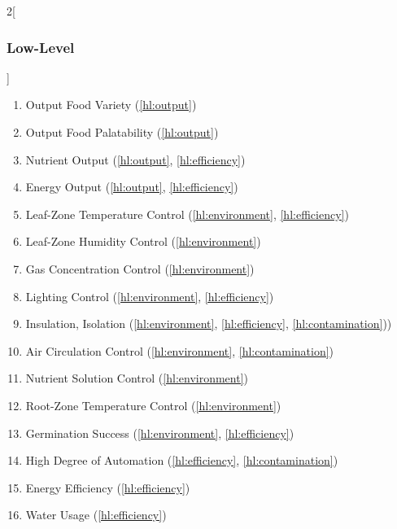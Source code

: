 \documentclass{report}
\begin{document}
\begin{multicols}{2}[\subsubsection{Low-Level}\label{sec:llos}]
    \begin{enumerate}[label=LL\arabic*., ref=LL\arabic*]
        \item \label{ll:output_variety} Output Food Variety \hfill (\ref{hl:output})
        \item \label{ll:output_palatability} Output Food Palatability \hfill (\ref{hl:output})
        \item \label{ll:output_nutrients} Nutrient Output \hfill (\ref{hl:output}, \ref{hl:efficiency})
        \item \label{ll:output_energy} Energy Output \hfill (\ref{hl:output}, \ref{hl:efficiency})
        \item \label{ll:control_airtemp} Leaf-Zone Temperature Control \hfill (\ref{hl:environment}, \ref{hl:efficiency})
        \item \label{ll:control_airhum} Leaf-Zone Humidity Control \hfill (\ref{hl:environment})
        \item \label{ll:control_gas} Gas Concentration Control \hfill (\ref{hl:environment})
        \item \label{ll:control_light} Lighting Control \hfill (\ref{hl:environment}, \ref{hl:efficiency})
        \item \label{ll:insulateisolate} Insulation, Isolation \hfill (\ref{hl:environment}, \ref{hl:efficiency}, \ref{hl:contamination}))
        \item \label{ll:control_aircirculation} Air Circulation Control \hfill (\ref{hl:environment}, \ref{hl:contamination})
        \item \label{ll:control_nutrientsolution} Nutrient Solution Control \hfill (\ref{hl:environment})
        \item \label{ll:control_roottemp} Root-Zone Temperature Control \hfill (\ref{hl:environment})
        \item \label{ll:germinationsuccess} Germination Success \hfill (\ref{hl:environment}, \ref{hl:efficiency})
        \item \label{ll:automation} High Degree of Automation \hfill (\ref{hl:efficiency}, \ref{hl:contamination})
        \item \label{ll:efficiency_energy} Energy Efficiency \hfill (\ref{hl:efficiency})
        \item \label{ll:efficiency_water} Water Usage \hfill (\ref{hl:efficiency})

\end{enumerate}
\end{multicols}
\end{document}
